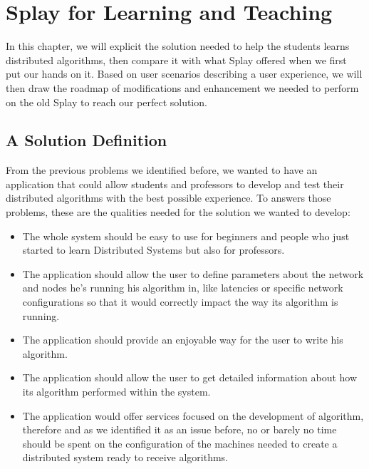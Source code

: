 \documentclass{eplmastersthesis}
\begin{document}
  \chapter{Splay for Learning and Teaching}
  \label{chap:splayteaching}

    In this chapter, we will explicit the solution needed to help the
    students learns distributed algorithms, then compare it with what Splay
    offered when we first put our hands on it. Based on user scenarios
    describing a user experience, we will then draw the roadmap of modifications
    and enhancement we needed to perform on the old Splay to reach our
    perfect solution.

    \section{A Solution Definition}

      From the previous problems we identified before, we wanted to have an
      application that could allow students and professors to develop and
      test their distributed algorithms with the best possible experience.
      To answers those problems, these are the qualities needed for the
      solution we wanted to develop:

      \begin{itemize}
        \item The whole system should be easy to use for beginners and people
        who just started to learn Distributed Systems but also for professors.
        \item The application should allow the user to define parameters about
        the network and nodes he's running his algorithm in, like latencies
        or specific network configurations so that it would correctly
        impact the way its algorithm is running.
        \item The application should provide an enjoyable way for the user
        to write his algorithm.
        \item The application should allow the user to get detailed information
        about how its algorithm performed within the system.
        \item The application would offer services focused on the development
        of algorithm, therefore and as we identified it as an issue before, no
        or barely no time should be spent on the configuration of the machines
        needed to create a distributed system ready to receive algorithms.
      \end{itemize}
\end{document}
